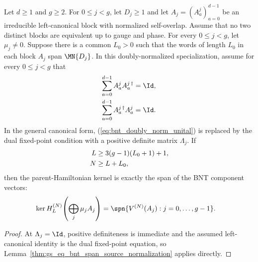 \begin{lemma}
    \label{thm:gs_eq_bnt_span}
    \leanok
    Let $d\ge1$ and $g\ge2$. For $0\le j<g$, let $D_j\ge1$ and
    let $A_j=(A^j_a)_{a=0}^{d-1}$ be an irreducible left-canonical block with
    normalized self-overlap. Assume that no two distinct blocks are equivalent
    up to gauge and phase. For every $0\le j<g$, let $\mu_j\ne0$. Suppose
    there is a common $L_0>0$ such that the words of length $L_0$ in each
    block $A_j$ span $\MN{D_j}$. In this doubly-normalized specialization,
    assume for every
    $0\le j<g$ that
    \begin{align}
        \sum_{a=0}^{d-1} A^j_a A^{j\,\dagger}_a & =\Id,
        \notag                                          \\
        \sum_{a=0}^{d-1} A^{j\,\dagger}_a A^j_a & =\Id.
        \label{eq:bnt_doubly_norm_unital}
    \end{align}
    In the general canonical form, (\ref{eq:bnt_doubly_norm_unital}) is replaced by the
    dual fixed-point condition with a positive definite matrix $\Lambda_j$.
    If
    \begin{align}
        L & \ge 3(g-1)(L_0+1)+1,
        \notag                   \\
        N & \ge L+L_0,
        \notag
    \end{align}
    then the parent-Hamiltonian kernel is exactly the span of the BNT component
    vectors:
    \begin{align}
        \ker H_L^{(N)}\!\left(\bigoplus_j \mu_j A_j\right)
         & =
        \spn\{V^{(N)}(A_j):j=0,\ldots,g-1\}.
        \label{eq:parent_bnt_ground_space}
    \end{align}
\end{lemma}

\begin{proof}
    \leanok
    At $\Lambda_j=\Id$, positive definiteness is immediate and the assumed
    left-canonical identity is the dual fixed-point equation, so
    Lemma~\ref{thm:gs_eq_bnt_span_source_normalization} applies directly.
\end{proof}

